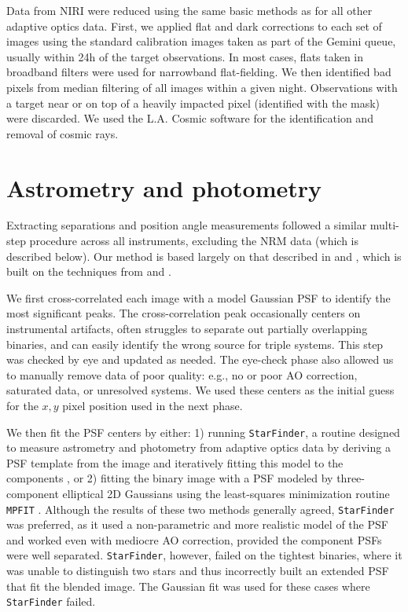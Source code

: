 \documentclass[twocolumn]{aastex62}
\begin{document}
Data from NIRI were reduced using the same basic methods as for all other adaptive optics data. First, we applied flat and dark corrections to each set of images using the standard calibration images taken as part of the Gemini queue, usually within 24h of the target observations. In most cases, flats taken in broadband filters were used for narrowband flat-fielding. We then identified bad pixels from median filtering of all images within a given night. Observations with a target near or on top of a heavily impacted pixel (identified with the mask) were discarded. We used the L.A. Cosmic software for the identification and removal of cosmic rays. 

\section{Astrometry and photometry}\label{sec:astrometry}

Extracting separations and position angle measurements followed a similar multi-step procedure across all instruments, excluding the NRM data (which is described below). Our method is based largely on that described in \citet{2016ApJ...817...80D} and \citet{Dupuy2017}, which is built on the techniques from \citet{2008ApJ...689..436L} and \citet{2010ApJ...721.1725D}.

We first cross-correlated each image with a model Gaussian PSF to identify the most significant peaks. The cross-correlation peak occasionally centers on instrumental artifacts, often struggles to separate out partially overlapping binaries, and can easily identify the wrong source for triple systems. This step was checked by eye and updated as needed. The eye-check phase also allowed us to manually remove data of poor quality: e.g., no or poor AO correction, saturated data, or unresolved systems. We used these centers as the initial guess for the $x, y$ pixel position used in the next phase. 

We then fit the PSF centers by either: 1) running {\tt StarFinder}, a routine designed to measure astrometry and photometry from adaptive optics data by deriving a PSF template from the image and iteratively fitting this model to the components \citep[for more details, see][]{2000A&AS..147..335D}, or 2) fitting the binary image with a PSF modeled by three-component elliptical 2D Gaussians using the least-squares minimization routine {\tt MPFIT} \citep{Markwart2009}. Although the results of these two methods generally agreed, {\tt StarFinder} was preferred, as it used a non-parametric and more realistic model of the PSF and worked even with mediocre AO correction, provided the component PSFs were well separated. {\tt StarFinder}, however, failed on the tightest binaries, where it was unable to distinguish two stars and thus incorrectly built an extended PSF that fit the blended image. The Gaussian fit was used for these cases where {\tt StarFinder} failed. 
\end{document}
